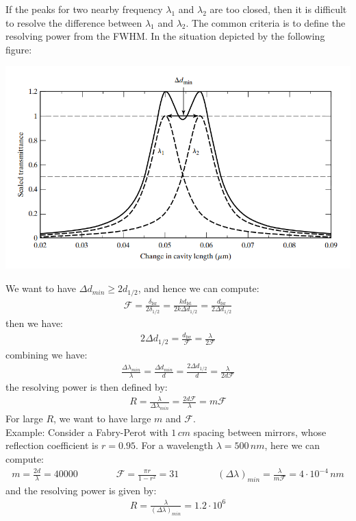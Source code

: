 \documentclass[11pt]{book}
\theoremstyle{break}
\theoremstyle{break}
\newcommand{\example}{\color{green}Example: \color{black}}
\begin{document}
If the peaks for two nearby frequency $\lambda_1$ and $\lambda_2$ are too closed, then it is difficult to resolve the difference between $\lambda_1$ and $\lambda_2$. The common criteria is to define the resolving power from the FWHM. In the situation depicted by the following figure:
\begin{center}
\includegraphics[scale=0.75]{resolP.png}
\end{center}
We want to have $\Delta d_{min} \geq 2d_{1/2}$, and hence we can compute:
\begin{align*}
\mathcal{F} = \frac{\delta_{\text{fsr}}}{2\delta_{1/2}} = \frac{k d_{\text{fst}}}{2k \Delta d_{1/2}} = \frac{d_{\text{fsr}}}{2\Delta d_{1/2}}
\end{align*}
then we have:
\begin{align*}
2\Delta d_{1/2} = \frac{d_{\text{fsr}}}{\mathcal{F}}  = \frac{\lambda}{2\mathcal{F}}
\end{align*}
combining we have:
\begin{align*}
\frac{\Delta \lambda_{min}}{\lambda} = \frac{\Delta d_{min}}{d} = \frac{2\Delta d_{1/2}}{d} = \frac{\lambda}{2d\mathcal{F}}
\end{align*}
the resolving power is then defined by:
\begin{align*}
R = \frac{\lambda}{\Delta \lambda_{min}}= \frac{2d\mathcal{F}}{\lambda} = m\mathcal{F}
\end{align*}
For large $R$, we want to have large $m$ and $\mathcal{F}$. \\

\example Consider a Fabry-Perot with $1\, cm$ spacing between mirrors, whose reflection coefficient is $r = 0.95$. For a wavelength $\lambda = 500\, nm$, here we can compute:
\begin{align*}
m = \frac{2d}{\lambda} = 40000 \qquad \qquad \mathcal{F} = \frac{\pi r}{1-r^2} = 31 \qquad\qquad (\Delta \lambda)_{min} = \frac{\lambda}{m\mathcal{F}} = 4 \cdot 10^{-4}\, nm
\end{align*}
and the resolving power is given by:
\begin{align*}
R = \frac{\lambda}{(\Delta \lambda)_{min}}= 1.2\cdot 10^6
\end{align*}
\end{document}
